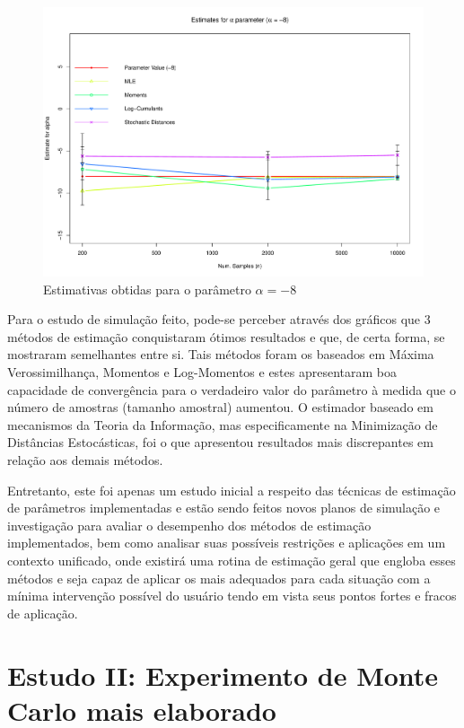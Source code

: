 \documentclass[12pt]{article}
\begin{document}
\begin{figure}[H]
     \centering
     \includegraphics[scale=0.5]{plots/ComparisonAlpha-8.pdf}
     \caption{Estimativas obtidas para o parâmetro $\alpha = -8$}
     \label{graf_7}
\end{figure}

Para o estudo de simulação feito, pode-se perceber através dos gráficos que 3 métodos de estimação conquistaram ótimos resultados e que, de certa forma, se mostraram semelhantes entre si. Tais métodos foram os baseados em Máxima Verossimilhança, Momentos e Log-Momentos e estes apresentaram boa capacidade de convergência para o verdadeiro valor do parâmetro à medida que o número de amostras (tamanho amostral) aumentou. O estimador baseado em mecanismos da Teoria da Informação, mas especificamente na Minimização de Distâncias Estocásticas, foi o que apresentou resultados mais discrepantes em relação aos demais métodos.

Entretanto, este foi apenas um estudo inicial a respeito das técnicas de estimação de parâmetros implementadas e estão sendo feitos novos planos de simulação e investigação para avaliar o desempenho dos métodos de estimação implementados, bem como analisar suas possíveis restrições e aplicações em um contexto unificado, onde existirá uma rotina de estimação geral que engloba esses métodos e seja capaz de aplicar os mais adequados para cada situação com a mínima intervenção possível do usuário tendo em vista seus pontos fortes e fracos de aplicação.


\section{Estudo II: Experimento de Monte Carlo mais elaborado}
\end{document}

